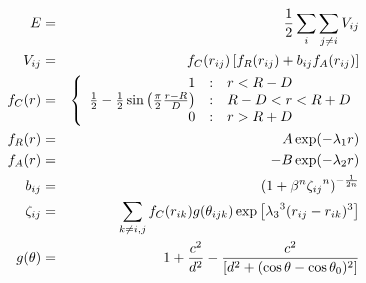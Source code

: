 \documentclass[12pt]{article}
\begin{document}
\begin{eqnarray*}
  E & = & \frac{1}{2} \sum_i \sum_{j \neq i} V_{ij} \\
  V_{ij} & = & f_C(r_{ij}) \left[ f_R(r_{ij}) + b_{ij} f_A(r_{ij}) \right] \\
  f_C(r) & = & \left\{ \begin{array} {r@{\quad:\quad}l}
    1 & r < R - D \\
    \frac{1}{2} - \frac{1}{2} \sin \left( \frac{\pi}{2} \frac{r-R}{D} \right) &
      R-D < r < R + D \\
    0 & r > R + D
    \end{array} \right. \\
  f_R(r) & = & A \exp (-\lambda_1 r) \\
  f_A(r) & = & -B \exp (-\lambda_2 r) \\
  b_{ij} & = & \left( 1 + \beta^n {\zeta_{ij}}^n \right)^{-\frac{1}{2n}} \\
  \zeta_{ij} & = & \sum_{k \neq i,j} f_C(r_{ik}) g(\theta_{ijk})
                   \exp \left[ {\lambda_3}^3 (r_{ij} - r_{ik})^3 \right] \\
  g(\theta) & = & 1 + \frac{c^2}{d^2} - 
                  \frac{c^2}{\left[ d^2 + 
		  (\cos \theta - \cos \theta_0)^2\right]}
\end{eqnarray*}                           
\end{document}
